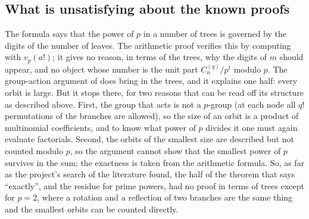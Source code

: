 \documentclass[11pt]{article}
\theoremstyle{definition}
\theoremstyle{remark}
\numberwithin{equation}{section}
\numberwithin{figure}{section}
\begin{document}
\subsection{What is unsatisfying about the known proofs}\label{sec:unsatisfying}
The formula says that the power of $p$ in a number of trees is governed by the digits of the number of leaves.
The arithmetic proof verifies this by computing with $v_p(a!)$; it gives no reason, in terms of the trees, why
the digits of $m$ should appear, and no object whose number is the unit part $C_n^{(q)}/p^t$ modulo $p$.
The group-action argument of \cite{Konvalinka} does bring in the trees, and it explains one half: every orbit
is large. But it stops there, for two reasons that can be read off its structure as described above.
First, the group that acts is not a $p$-group (at each node all $q!$ permutations of the branches are
allowed), so the size of an orbit is a product of multinomial coefficients, and to know what power of $p$
divides it one must again evaluate factorials. Second, the orbits of the smallest size are described but not
counted modulo $p$, so the argument cannot show that the smallest power of $p$ survives in the sum; the
exactness is taken from the arithmetic formula. So, as far as the project's search of the literature found,
the half of the theorem that says ``exactly'', and the residue for prime powers, had no proof in terms of
trees except for $p=2$, where a rotation and a reflection of two branches are the same thing and the smallest
orbits can be counted directly.
\end{document}
